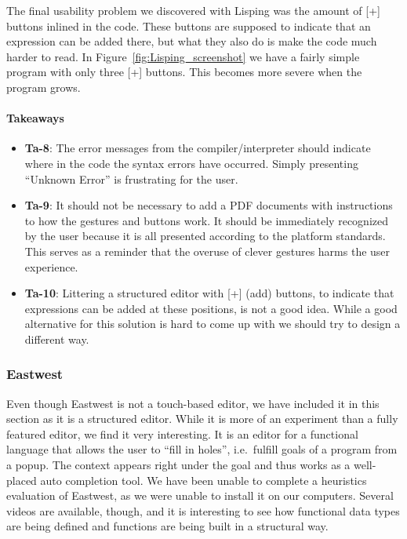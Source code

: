 The final usability problem we discovered with Lisping was the amount of [+] buttons inlined in the code. These buttons are supposed to indicate that an expression can be added there, but what they also do is make the code much harder to read.
In Figure~\ref{fig:Lisping_screenshot} we have a fairly simple program with
only three [+] buttons. This becomes more severe when the program grows.

\paragraph{Takeaways}
\begin{itemize}
	\item \textbf{Ta-8}: The error messages from the compiler/interpreter should indicate where in the code the syntax errors have occurred. Simply presenting ``Unknown Error'' is frustrating for the user.
	\item \textbf{Ta-9}: It should not be necessary to add a PDF documents with instructions to how the gestures and buttons work. It should be immediately recognized by the user because it is all presented according to the platform standards. This serves as a reminder that the overuse of clever gestures harms the user experience.
	\item \textbf{Ta-10}: Littering a structured editor with [+] (add) buttons, to indicate that expressions can be added at these positions, is not a good idea. While a good alternative for this solution is hard to come up with we should try to design a different way.
\end{itemize}

\subsubsection{Eastwest}
\label{subsub:Eastwest}
Even though Eastwest is not a touch-based editor, we have included it in this section as it is a structured editor. 
While it is more of an experiment than a fully featured editor, we find it very interesting. It is an editor for a functional language that allows the user to ``fill in holes'', i.e.\ fulfill goals of a program from a popup. The context appears right under the goal and thus works as a well-placed auto completion tool. We have been unable to complete a heuristics evaluation of Eastwest, as we were unable to install it on our computers. Several videos are available, though, and it is interesting to see how functional data types are being defined and functions are being built in a structural way.

